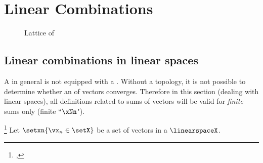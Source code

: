 
\chapter{Linear Combinations}
\begin{figure}
  \centering%
  \gsize%
  \caption{Lattice of }
\end{figure}
\section{Linear combinations in linear spaces}
A   in general is not equipped with a 
. 
Without a topology, it is not possible to determine whether an  
of vectors converges.
Therefore in this section (dealing with linear spaces), 
all definitions related to sums of vectors will be valid for \emph{finite} sums only (finite ``$\xNn$").

\begin{definition}
\footnote{
  ,
  }
\label{def:lincombo}
Let $\setxn{\vx_n\in\setX}$ be a set of vectors in a  $\linearspaceX$.
\end{definition}

